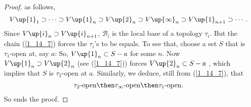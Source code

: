 \begin{proof}
as follows,
%
  \begin{align}\label{1_14_7}
    V\up{1}_1 
      \supset
    \cdots 
      \supset 
    V\up{1}_n
      \supset 
    V\up{2}_n 
      \supset 
    V\up{\infty}_n 
      \supset 
    V\up{1}_{n+1} 
      \supset 
    \cdots .
  \end{align}
%
Since 
  $V\up{i}_n\supset V\up{i}_{n+1}$, 
$\mathscr{B}_i$ is the local base of a topology $\tau_i$. 
But the chain (\ref{1_14_7}) forces the $\tau_i$'s to be equals. 
To see that, choose a set $S$ that is $\tau_1$-open at, say $a$: So, 
%
  $V\up{1}_n \subset S-a$  
%
for some $n$. Now $V\up{1}_n \supset V\up{2}_n$ (see (\ref{1_14_7})) forces  
%
  $V\up{2}_n \subset S-a$ , 
%
which implies that $S$ is $\tau_2$-open at $a$.
Similarly, we deduce, still from (\ref{1_14_7}), that 
\begin{align}
  \tau_2\text{-open} 
    \then 
  \tau_\infty\text{-open} 
    \then 
  \tau_1\text{-open}.
\end{align}
So ends the proof.
\end{proof}





